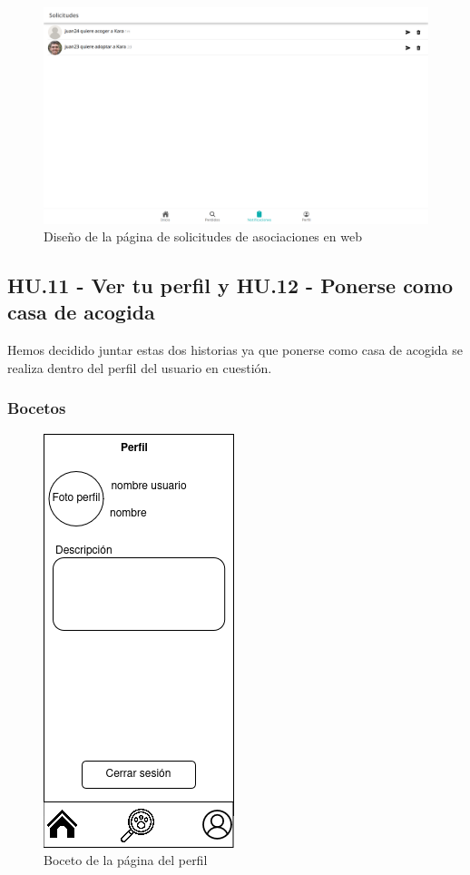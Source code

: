 \begin{figure}[H]
	\centering
	\includegraphics[width=1\linewidth]{sprint 3//hu9-10/solicitudesWeb.png}
	\caption{Diseño de la página de solicitudes de asociaciones en web}
\end{figure}

\subsection{HU.11 - Ver tu perfil y HU.12 - Ponerse como casa de acogida}

Hemos decidido juntar estas dos historias ya que ponerse como casa de acogida se realiza dentro del perfil del usuario en cuestión.

\subsubsection{Bocetos}
\begin{figure}[H]
	\centering
	\includegraphics[width=0.31\linewidth]{sprint 3//hu11-12/boceto.png}
	\caption{Boceto de la página del perfil}
\end{figure}

